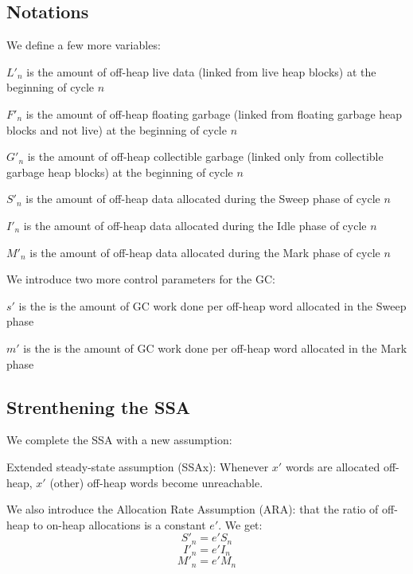 \documentclass{article}
\begin{document}
\subsection{Notations}

We define a few more variables:

\bigskip
$L'_n$ is the amount of off-heap live data (linked from live
heap blocks) at the beginning of cycle $n$

$F'_n$ is the amount of off-heap floating garbage (linked from
floating garbage heap blocks and not live) at the beginning of
cycle $n$

$G'_n$ is the amount of off-heap collectible garbage (linked only from
collectible garbage heap blocks) at the beginning of cycle $n$

$S'_n$ is the amount of off-heap data allocated during the Sweep phase
of cycle $n$

$I'_n$ is the amount of off-heap data allocated during the Idle phase
of cycle $n$

$M'_n$ is the amount of off-heap data allocated during the Mark phase
of cycle $n$

We introduce two more control parameters for the GC:

$s'$ is the is the amount of GC work done per off-heap word allocated
in the Sweep phase

$m'$ is the is the amount of GC work done per off-heap word allocated
in the Mark phase

\subsection{Strenthening the SSA}

We complete the SSA with a new assumption:

Extended steady-state assumption (SSAx): Whenever $x'$ words are
allocated off-heap, $x'$ (other) off-heap words become unreachable.

We also introduce the Allocation Rate Assumption (ARA): that the ratio
of off-heap to on-heap allocations is a constant $e'$. We get:
\begin{equation}\label{eqn-S'}
S'_n = e' S_n
\end{equation}
\begin{equation}\label{eqn-I'}
I'_n = e' I_n
\end{equation}
\begin{equation}\label{eqn-M'}
M'_n = e' M_n
\end{equation}
\end{document}
